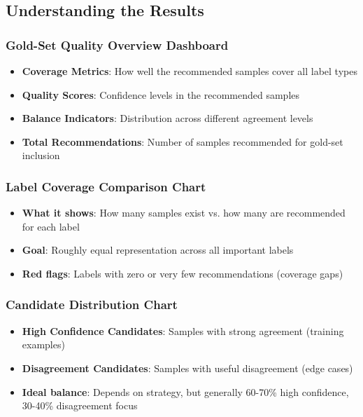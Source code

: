 \documentclass[11pt]{article}
\begin{document}
\subsection{Understanding the Results}

\subsubsection{Gold-Set Quality Overview Dashboard}
\begin{itemize}
\item \textbf{Coverage Metrics}: How well the recommended samples cover all label types
\item \textbf{Quality Scores}: Confidence levels in the recommended samples
\item \textbf{Balance Indicators}: Distribution across different agreement levels
\item \textbf{Total Recommendations}: Number of samples recommended for gold-set inclusion
\end{itemize}

\subsubsection{Label Coverage Comparison Chart}
\begin{itemize}
\item \textbf{What it shows}: How many samples exist vs. how many are recommended for each label
\item \textbf{Goal}: Roughly equal representation across all important labels
\item \textbf{Red flags}: Labels with zero or very few recommendations (coverage gaps)
\end{itemize}

\subsubsection{Candidate Distribution Chart}
\begin{itemize}
\item \textbf{High Confidence Candidates}: Samples with strong agreement (training examples)
\item \textbf{Disagreement Candidates}: Samples with useful disagreement (edge cases)
\item \textbf{Ideal balance}: Depends on strategy, but generally 60-70\% high confidence, 30-40\% disagreement focus
\end{itemize}
\end{document}

